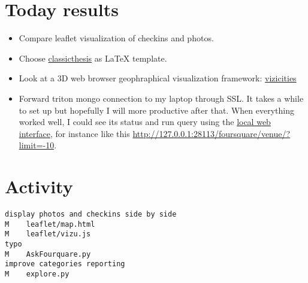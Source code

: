 \section*{Today results}
\begin{itemize}
	\item Compare leaflet visualization of checkins and photos.
	\item Choose
		\href{https://code.google.com/p/classicthesis/}{classicthesis} as
		\LaTeX{} template.
	\item Look at a 3D web browser geophraphical visualization framework:
		\href{https://github.com/robhawkes/vizicities}{vizicities}
	\item Forward triton mongo connection to my laptop through SSL. It takes a
		while to set up but hopefully I will more productive after that. When
		everything worked well, I could see its status and run query using the
		\href{http://docs.mongodb.org/ecosystem/tools/http-interfaces/}{local
		web interface}, for instance like this
		\href{http://127.0.0.1:28113/foursquare/venue/?limit=-10}{\url{http://127.0.0.1:28113/foursquare/venue/?limit=-10}}.
\end{itemize}

\section*{Activity}
\begin{verbatim}
display photos and checkins side by side
M    leaflet/map.html
M    leaflet/vizu.js
typo
M    AskFourquare.py
improve categories reporting
M    explore.py
\end{verbatim}
